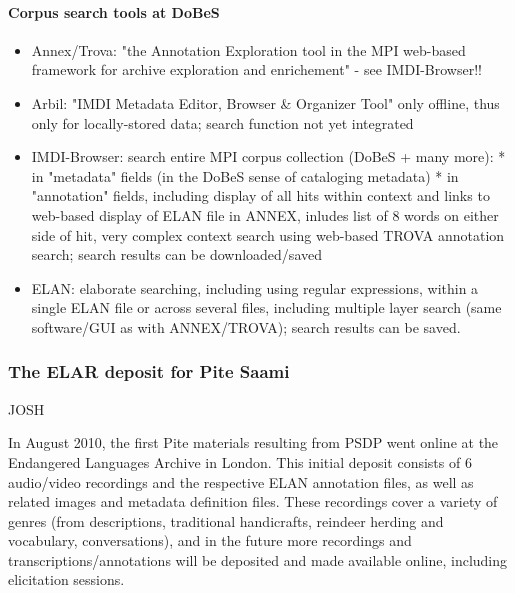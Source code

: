 \documentclass[a4paper,12pt]{article}
\begin{document}
\paragraph{Corpus search tools at DoBeS}
\begin{itemize}
\item Annex/Trova: "the Annotation Exploration tool in the MPI web-based framework for archive exploration and enrichement" - see IMDI-Browser!!
\item Arbil: "IMDI Metadata Editor, Browser \& Organizer Tool" only offline, thus only for locally-stored data; search function not yet integrated
\item IMDI-Browser: search entire MPI corpus collection (DoBeS + many more):
	* in "metadata" fields (in the DoBeS sense of cataloging metadata)
	* in "annotation" fields, including display of all hits within context and links to web-based display of ELAN file in ANNEX, inludes list of 8 words on either side of hit, very complex context search using web-based TROVA annotation search; search results can be downloaded/saved
\item ELAN: elaborate searching, including using regular expressions, within a single ELAN file or across several files, including multiple layer search (same software/GUI as with ANNEX/TROVA); search results can be saved.	
\end{itemize}


\subsubsection{The ELAR deposit for Pite Saami}
JOSH

In August 2010, the first Pite materials resulting from PSDP went online at the Endangered Languages Archive in London. This initial deposit consists of 6 audio/video recordings and the respective ELAN annotation files, as well as related images and metadata definition files. These recordings cover a variety of genres (from descriptions, traditional handicrafts, reindeer herding and vocabulary, conversations), and in the future more recordings and transcriptions/annotations will be deposited and made available online, including elicitation sessions.
\end{document}

